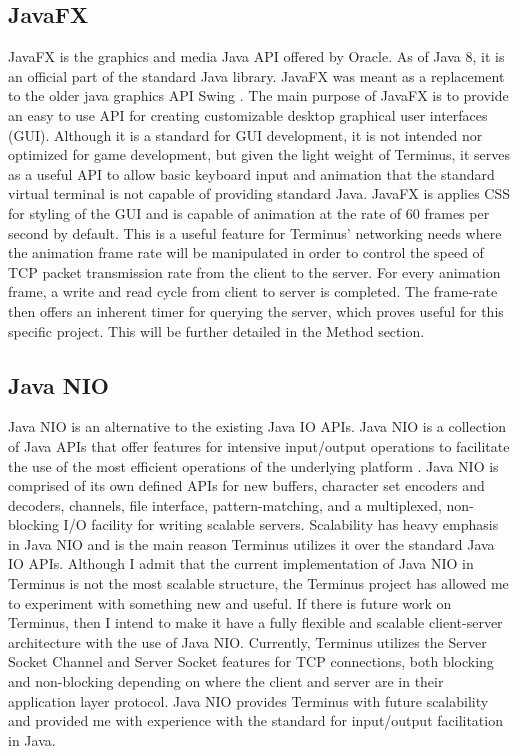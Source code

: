 \documentclass[12pt]{article}
\begin{document}
\subsection{JavaFX}
    JavaFX is the graphics and media Java API offered by Oracle. As of Java 8, it is an official part of the standard Java library. JavaFX was meant as a replacement to the older java graphics API Swing \cite{oracle}. The main purpose of JavaFX is to provide an easy to use API for creating customizable desktop graphical user interfaces (GUI). Although it is a standard for GUI development, it is not intended nor optimized for game development, but given the light weight of Terminus, it serves as a useful API to allow basic keyboard input and animation that the standard virtual terminal is not capable of providing standard Java. JavaFX is applies CSS for styling of the GUI and is capable of animation at the rate of 60 frames per second by default. This is a useful feature for Terminus' networking needs where the animation frame rate will be manipulated in order to control the speed of TCP packet transmission rate from the client to the server. For every animation frame, a write and read cycle from client to server is completed. The frame-rate then offers an inherent timer for querying the server, which proves useful for this specific project. This will be further detailed in the Method section.

\subsection{Java NIO}
    Java NIO is an alternative to the existing Java IO APIs. Java NIO is a collection of Java APIs that offer features for intensive input/output operations to facilitate the use of the most efficient operations of the underlying platform \cite{nio}. Java NIO is comprised of its own defined APIs for new buffers, character set encoders and decoders, channels, file interface, pattern-matching, and a multiplexed, non-blocking I/O facility for writing scalable servers. Scalability has heavy emphasis in Java NIO and is the main reason Terminus utilizes it over the standard Java IO APIs. Although I admit that the current implementation of Java NIO in Terminus is not the most scalable structure, the Terminus project has allowed me to experiment with something new and useful. If there is future work on Terminus, then I intend to make it have a fully flexible and scalable client-server architecture with the use of Java NIO. Currently, Terminus utilizes the Server Socket Channel and Server Socket features for TCP connections, both blocking and non-blocking depending on where the client and server are in their application layer protocol. Java NIO provides Terminus with future scalability and provided me with experience with the standard for input/output facilitation in Java.
\end{document}
